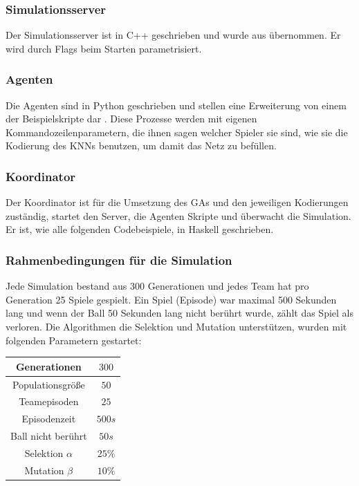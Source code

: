         \subsubsection*{Simulationsserver}
        Der Simulationsserver ist in C++ geschrieben und wurde aus \cite{hfo} übernommen. Er wird durch Flags beim Starten parametrisiert. 

        \subsubsection*{Agenten}
        Die Agenten sind in Python geschrieben und stellen eine Erweiterung von einem der Beispielskripte dar \cite{hfo}. Diese Prozesse werden mit eigenen Kommandozeilenparametern, die ihnen sagen welcher Spieler sie sind, wie sie die Kodierung des KNNs benutzen, um damit das Netz zu befüllen.

        \subsubsection*{Koordinator}
        Der Koordinator ist für die Umsetzung des GAs und den jeweiligen Kodierungen zuständig, startet den Server, die Agenten Skripte und überwacht die Simulation. Er ist, wie alle folgenden Codebeispiele, in Haskell geschrieben.


        \subsubsection*{Rahmenbedingungen für die Simulation}
        Jede Simulation bestand aus 300 Generationen und jedes Team hat pro Generation 25 Spiele gespielt. Ein Spiel (Episode) war maximal 500 Sekunden lang und wenn der Ball 50 Sekunden lang nicht berührt wurde, zählt das Spiel als verloren. Die Algorithmen die Selektion und Mutation unterstützen, wurden mit folgenden Parametern gestartet:
        \hfill \\
        \begin{center}
            \begin{tabular}{ |c|c| } 
                \hline
                Generationen       & $300$  \\ \hline
                Populationsgröße   & $50$   \\ \hline
                Teamepisoden       & $25$   \\ \hline
                Episodenzeit       & $500s$ \\ \hline
                Ball nicht berührt & $50s$  \\ \hline
                Selektion $\alpha$ & $25\%$ \\ \hline
                Mutation $\beta$   & $10\%$ \\ \hline
            \end{tabular}
        \end{center}

